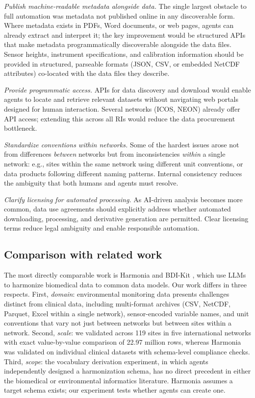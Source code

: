\documentclass[review,authoryear]{elsarticle}
\begin{document}
\textit{Publish machine-readable metadata alongside data.} The single largest obstacle to full automation was metadata not published online in any discoverable form. Where metadata exists in PDFs, Word documents, or web pages, agents can already extract and interpret it; the key improvement would be structured APIs that make metadata programmatically discoverable alongside the data files. Sensor heights, instrument specifications, and calibration information should be provided in structured, parseable formats (JSON, CSV, or embedded NetCDF attributes) co-located with the data files they describe.

\textit{Provide programmatic access.} APIs for data discovery and download would enable agents to locate and retrieve relevant datasets without navigating web portals designed for human interaction. Several networks (ICOS, NEON) already offer API access; extending this across all RIs would reduce the data procurement bottleneck.

\textit{Standardize conventions within networks.} Some of the hardest issues arose not from differences \emph{between} networks but from inconsistencies \emph{within} a single network: e.g., sites within the same network using different unit conventions, or data products following different naming patterns. Internal consistency reduces the ambiguity that both humans and agents must resolve.

\textit{Clarify licensing for automated processing.} As AI-driven analysis becomes more common, data use agreements should explicitly address whether automated downloading, processing, and derivative generation are permitted. Clear licensing terms reduce legal ambiguity and enable responsible automation.

\subsection{Comparison with related work}
\label{sec:related-comparison}

The most directly comparable work is Harmonia and BDI-Kit \citep{santos2025harmonia, lopez2026bdikit}, which use LLMs to harmonize biomedical data to common data models. Our work differs in three respects. First, \emph{domain}: environmental monitoring data presents challenges distinct from clinical data, including multi-format archives (CSV, NetCDF, Parquet, Excel within a single network), sensor-encoded variable names, and unit conventions that vary not just between networks but between sites within a network. Second, \emph{scale}: we validated across 119 sites in five international networks with exact value-by-value comparison of 22.97 million rows, whereas Harmonia was validated on individual clinical datasets with schema-level compliance checks. Third, \emph{scope}: the vocabulary derivation experiment, in which agents independently designed a harmonization schema, has no direct precedent in either the biomedical or environmental informatics literature. Harmonia assumes a target schema exists; our experiment tests whether agents can create one.
\end{document}
